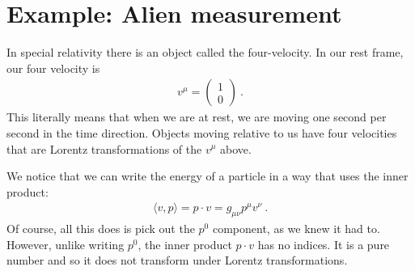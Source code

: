 \documentclass[12pt, oneside]{report}    %
\let\oldsection\section
\def\section{%
  \setcounter{sidenote}{1}%
  \oldsection
}
\begin{document}


\section{Example: Alien measurement}
\label{sec:relativity:alien}


In special relativity there is an object called the four-velocity. In our rest frame, our four velocity is
\begin{align}
    v^\mu = \begin{pmatrix}
        1\\ 0
    \end{pmatrix} \ .
    \label{eq:4:velocity:in:rest:Frame}
\end{align}
This literally means that when we are at rest, we are moving one second per second in the time direction. Objects moving relative to us have four velocities that are Lorentz transformations of the $v^\mu$ above. 

We notice that we can write the energy of a particle in a way that uses the inner product:
\begin{align}
    \langle v, p\rangle = p\cdot v = g_{\mu\nu} p^\mu v^\nu \ .
\end{align}
Of course, all this does is pick out the $p^0$ component, as we knew it had to. However, unlike writing $p^0$, the inner product $p\cdot v$ has no indices. It is a pure number and so it does not transform under Lorentz transformations. 
\end{document}
